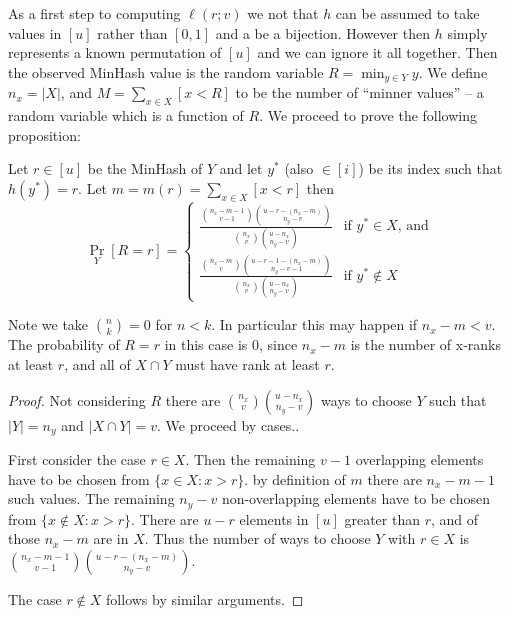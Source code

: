 As a first step to computing $\ell(r;v)$ we not that $h$ can be assumed to take values in $[u]$ rather than $[0,1]$ and a be a bijection.
However then $h$ simply represents a known permutation of $[u]$ and we can ignore it all together.
Then the observed MinHash value is the random variable $R=\min_{y\in Y} y$.
We define $n_x = |X|$, and $M = \sum_{x\in X} [x < R]$ to be the number of ``minner values'' -- a random variable which is a function of $R$.
We proceed to prove the following proposition:
\begin{proposition}
   Let $r\in[u]$ be the MinHash of $Y$ and let $y^*$ (also $\in[i]$) be its index such that $h(y^*)=r$.
   Let $m=m(r)=\sum_{x\in X}[x < r]$ then
\[
   \Pr_Y[R=r]
    =
    \begin{cases}
      \frac{\binom{n_x-m-1}{v-1}\binom{u-r-(n_x-m)}{n_y-v}}{\binom{n_x}{v}\binom{u-n_x}{n_y-v}}
      &
      \text{if $y^*\in X$, and}
       \\
      \frac{\binom{n_x-m}{v}\binom{u-r-1-(n_x-m)}{n_y-v-1}}{\binom{n_x}{v}\binom{u-n_x}{n_y-v}}
      & \text{if $y^*\not\in X$}
    \end{cases}
 \]
 \label{prop:prob}
\vspace{-1em} %
\end{proposition}
Note we take $\binom{n}{k}=0$ for $n<k$.
In particular this may happen if $n_x-m<v$.
The probability of $R=r$ in this case is 0, since $n_x-m$ is the number of x-ranks at least $r$, and all of $X\cap Y$ must have rank at least $r$.
\begin{proof}
   Not considering $R$ there are $\binom{n_x}{v}\binom{u-n_x}{n_y-v}$ ways to choose $Y$ such that $|Y|=n_y$ and $|X\cap Y|=v$.
   We proceed by cases..

   First consider the case $r\in X$.
   Then the remaining $v-1$ overlapping elements have to be chosen from $\{x\in X:x > r\}$.
   by definition of $m$ there are $n_x-m-1$ such values.
   The remaining $n_y-v$ non-overlapping elements have to be chosen from $\{x\not\in X: x > r \}$.
   There are $u-r$ elements in $[u]$ greater than $r$, and of those $n_x-m$ are in $X$.
   Thus the number of ways to choose $Y$ with $r\in X$ is
   $\binom{n_x-m-1}{v-1}\binom{u-r-(n_x-m)}{n_y-v}$.

   The case $r\not\in X$ follows by similar arguments.
\end{proof}

